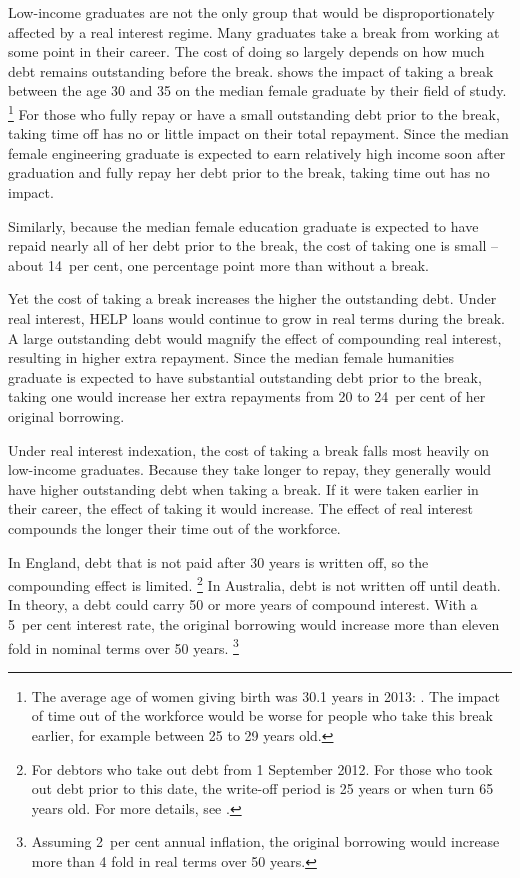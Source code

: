 \documentclass[embargoed]{grattan}
\begin{document}
Low-income graduates are not the only group that would be disproportionately affected by a real interest regime.
Many graduates take a break from working at some point in their career.
The cost of doing so largely depends on how much debt remains outstanding before the break.
 shows the impact of taking a break between the age 30 and 35 on the median female graduate by their field of study.%
\footnote{The average age of women giving birth was 30.1 years in 2013: \textcite{AIHW2015Australiasmothersbabies}.
The impact of time out of the workforce would be worse for people who take this break earlier, for example between 25 to 29 years old.} 
For those who fully repay or have a small outstanding debt prior to the break, taking time off has no or little impact on their total repayment.
Since the median female engineering graduate is expected to earn relatively high income soon after graduation and fully repay her debt prior to the break, taking time out has no impact.

Similarly, because the median female education graduate is expected to have repaid nearly all of her debt prior to the break, the cost of taking one is small -- about 14~per cent, one percentage point more than without a break.

Yet the cost of taking a break increases the higher the outstanding debt.
Under real interest, \gls{HELP} loans would continue to grow in real terms during the break.
A large outstanding debt would magnify the effect of compounding real interest, resulting in higher extra repayment.
Since the median female humanities graduate is expected to have substantial outstanding debt prior to the break, taking one would increase her extra repayments from 20 to 24~per cent of her original borrowing.

Under real interest indexation, the cost of taking a break falls most heavily on low-income graduates.
Because they take longer to repay, they generally would have higher outstanding debt when taking a break.
If it were taken earlier in their career, the effect of taking it would increase.
The effect of real interest compounds the longer their time out of the workforce.

In England, debt that is not paid after 30 years is written off, so the compounding effect is limited.%
\footnote{For debtors who take out debt from 1 September 2012.
For those who took out debt prior to this date, the write-off period is 25 years or when turn 65 years old.
For more details, see \textcite{Company2016LoanCancellation}.} 
In Australia, debt is not written off until death.
In theory, a debt could carry 50 or more years of compound interest.
With a 5~per cent interest rate, the original borrowing would increase more than eleven fold in nominal terms over 50 years.%
\footnote{Assuming 2~per cent annual inflation, the original borrowing would increase more than 4 fold in real terms over 50 years.}
\end{document}
